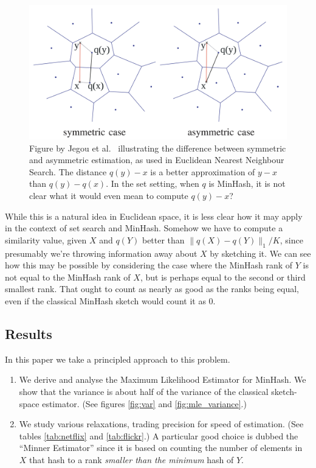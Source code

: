 \begin{figure}[h]
   \centering
   \includegraphics[width=\linewidth]{figures/pq}
\caption{Figure by Jegou et al.~\cite{jegou2010product} illustrating the difference between symmetric and asymmetric estimation, as used in Euclidean Nearest Neighbour Search.
   The distance $q(y)-x$ is a better approximation of $y-x$ than $q(y)-q(x)$.
   In the set setting, when $q$ is MinHash, it is not clear what it would even mean to compute $q(y)-x$?
}
   \label{fig:jegou}
\end{figure}


While this is a natural idea in Euclidean space, it is less clear how it may apply in the context of set search and MinHash.
Somehow we have to compute a similarity value, given $X$ and $q(Y)$ better than $\|q(X)-q(Y)\|_1/K$, since presumably we're throwing information away about $X$ by sketching it.
We can see how this may be possible by considering the case where the MinHash rank of $Y$ is not equal to the MinHash rank of $X$, but is perhaps equal to the second or third smallest rank.
That ought to count as nearly as good as the ranks being equal, even if the classical MinHash sketch would count it as 0.

\subsection{Results}

In this paper we take a principled approach to this problem.
\begin{enumerate}
   \item We derive and analyse the Maximum Likelihood Estimator for MinHash.
      We show that the variance is about half of the variance of the classical sketch-space estimator. (See figures \ref{fig:var} and \ref{fig:mle_variance}.)
   \item We study various relaxations, trading precision for speed of estimation. (See tables \ref{tab:netflix} and \ref{tab:flickr}.)
      A particular good choice is dubbed the ``Minner Estimator'' since it is based on counting the number of elements in $X$ that hash to a rank \emph{smaller than the minimum} hash of $Y$.
\end{enumerate}

